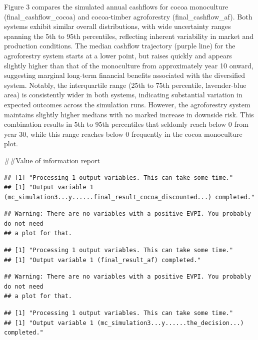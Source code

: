 \documentclass[
]{article}
\begin{document}
Figure 3 compares the simulated annual cashflows for cocoa monoculture
(final\_cashflow\_cocoa) and cocoa-timber agroforestry
(final\_cashflow\_af). Both systems exhibit similar overall
distributions, with wide uncertainty ranges spanning the 5th to 95th
percentiles, reflecting inherent variability in market and production
conditions. The median cashflow trajectory (purple line) for the
agroforestry system starts at a lower point, but raises quickly and
appears slightly higher than that of the monoculture from approximately
year 10 onward, suggesting marginal long-term financial benefits
associated with the diversified system. Notably, the interquartile range
(25th to 75th percentile, lavender-blue area) is consistently wider in
both systems, indicating substantial variation in expected outcomes
across the simulation runs. However, the agroforestry system maintains
slightly higher medians with no marked increase in downside risk. This
combination results in 5th to 95th percentiles that seldomly reach below
0 from year 30, while this range reaches below 0 frequently in the cocoa
monoculture plot.

\#\#Value of information report

\begin{verbatim}
## [1] "Processing 1 output variables. This can take some time."
## [1] "Output variable 1 (mc_simulation3...y......final_result_cocoa_discounted...) completed."
\end{verbatim}

\begin{verbatim}
## Warning: There are no variables with a positive EVPI. You probably do not need
## a plot for that.
\end{verbatim}

\begin{verbatim}
## [1] "Processing 1 output variables. This can take some time."
## [1] "Output variable 1 (final_result_af) completed."
\end{verbatim}

\begin{verbatim}
## Warning: There are no variables with a positive EVPI. You probably do not need
## a plot for that.
\end{verbatim}

\begin{verbatim}
## [1] "Processing 1 output variables. This can take some time."
## [1] "Output variable 1 (mc_simulation3...y......the_decision...) completed."
\end{verbatim}
\end{document}
